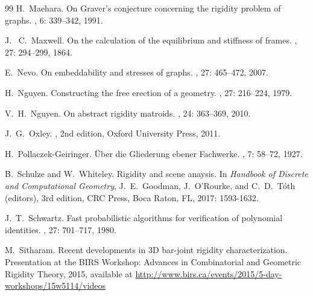 \documentclass{daj}
\begin{document}
\begin{thebibliography}{99}
H.~Maehara. 
\newblock  On Graver's conjecture concerning the rigidity problem of graphs.
, 6: 339--342,  1991.

J. ~C.~Maxwell. 
\newblock  On the calculation of the equilibrium and stiffness of frames.
, 27:  294--299, 1864.

 E.~Nevo. 
\newblock  On embeddability and stresses of graphs.
, 27: 465--472, 2007.


 H.~Nguyen. 
\newblock  Constructing the free erection of a geometry.
, 27: 216--224, 1979.

 V.~H.~Nguyen. 
\newblock  On abstract rigidity matroids.
, 24: 363--369,  2010.

 J.~G.~Oxley. 
, 2nd edition, Oxford University Press, 2011.



 H.~Pollaczek-Geiringer. 
\newblock  \"{U}ber die Gliederung ebener Fachwerke.
, 7: 58--72,   1927.

 {B.~Schulze and W.~Whiteley}. 
\newblock  Rigidity and scene anaysis. In
{\em Handbook of Discrete and Computational Geometry}, J.~E.~Goodman, J.~O'Rourke, and C.~D.~T\'oth (editors), 3rd edition, CRC Press, Boca Raton, FL, 2017: 1593-1632.



 J.~T.~Schwartz. 
\newblock  Fast probabilistic algorithms for verification of polynomial identities.
, 27: 701--717, 1980.



 M.~Sitharam. 
\newblock  Recent developments in 3D bar-joint rigidity characterization. Presentation at the BIRS Workshop: Advances in Combinatorial and Geometric Rigidity Theory,  2015,
available at 
\url{http://www.birs.ca/events/2015/5-day-workshops/15w5114/videos}
%




\end{thebibliography}
\end{document}
